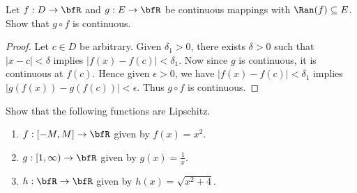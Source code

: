 \documentclass[11pt,twoside,openany]{memoir}
\begin{document}
    \begin{exercise}
        Let $f:D \rightarrow \bfR$ and $g:E \rightarrow \bfR$ be continuous mappings with $\Ran(f) \subseteq E$. Show that $g \circ f$ is continuous.
    \end{exercise}
        \begin{proof}
            Let $c \in D$ be arbitrary. Given $\delta_1 > 0$, there exists $\delta>0$ such that $|x-c| < \delta$ implies $|f(x) - f(c)| < \delta_1$. Now since $g$ is continuous, it is continuous at $f(c)$. Hence given $\epsilon>0$, we have $|f(x) - f(c)| < \delta_1$ implies $|g(f(x)) - g(f(c))| < \epsilon$. Thus $g \circ f$ is continuous.
        \end{proof}
    \begin{exercise}
        Show that the following functions are Lipschitz.
            \begin{enumerate}[label = (\arabic*)]
                \item $f:[-M,M] \rightarrow \bfR$ given by $f(x) = x^2$.
                \item $g:[1,\infty) \rightarrow \bfR$ given by $g(x) = \frac{1}{x}$.
                \item $h:\bfR \rightarrow \bfR$ given by $h(x) = \sqrt{x^2 + 4}$.
            \end{enumerate}
    \end{exercise}
\end{document}

